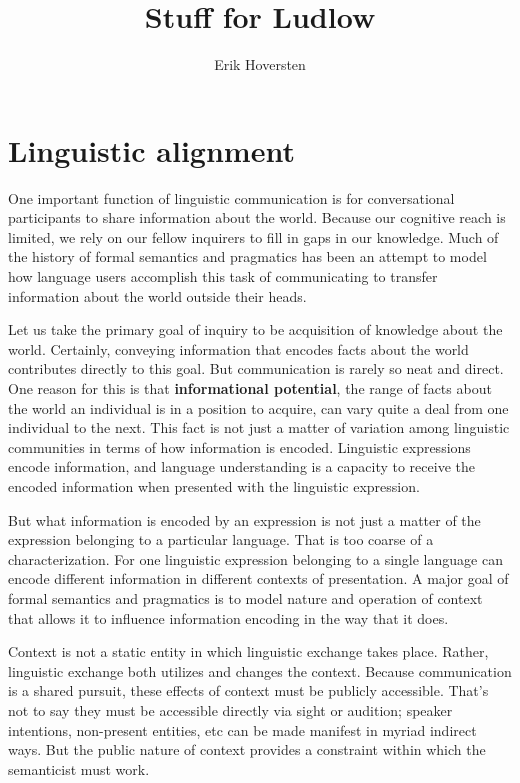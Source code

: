 \documentclass[letterpaper,10pt]{article}
\title{Stuff for Ludlow}
\author{Erik Hoversten}
\begin{document}

%

\section{Linguistic alignment}

One important function of linguistic communication is for conversational participants to share information about the world.  Because our cognitive reach is limited, we rely on our fellow inquirers to fill in gaps in our knowledge. Much of the history of formal semantics and pragmatics has been an attempt to model how language users accomplish this task of communicating to transfer information about the world outside their heads.

Let us take the primary goal of inquiry to be acquisition of knowledge about the world.  Certainly, conveying information that encodes facts about the world contributes directly to this goal.  But communication is rarely so neat and direct.  One reason for this is that \textbf{informational potential}, the range of facts about the world an individual is in a position to acquire, can vary quite a deal from one individual to the next. This fact is not just a matter of variation among linguistic communities in terms of how information is encoded.  Linguistic expressions encode information, and language understanding is a capacity to receive the encoded information when presented with the linguistic expression.

But what information is encoded by an expression is not just a matter of the expression belonging to a particular language.  That is too coarse of a characterization.  For one linguistic expression belonging to a single language can encode different information in different contexts of presentation.  A major goal of formal semantics and pragmatics is to model nature and operation of context that allows it to influence information encoding in the way that it does.

Context is not a static entity in which linguistic exchange takes place.  Rather, linguistic exchange both utilizes and changes the context.  Because communication is a shared pursuit, these effects of context must be publicly accessible.  That's not to say they must be accessible directly via sight or audition; speaker intentions, non-present entities, etc can be made manifest in myriad indirect ways.  But the public nature of context provides a constraint within which the semanticist must work.
\end{document}
